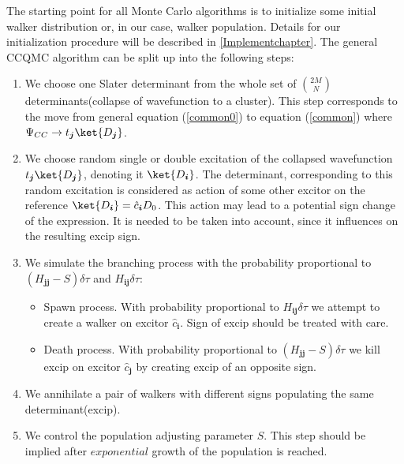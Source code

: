 \documentclass[twoside,english]{uiofysmaster}
\begin{document}
The starting point for all Monte Carlo algorithms is to initialize some initial walker distribution or, in our case, walker population. Details for our initialization procedure will be described in \autoref{Implementchapter}. The general CCQMC algorithm can be split up into the following steps:

\begin{enumerate}
	\item  We choose one Slater determinant from the whole set of $\binom {2M}{N}$ determinants(collapse of wavefunction to a cluster). This step corresponds to the move from general equation (\ref{common0}) to equation (\ref{common}) where $\Psi_{CC} \rightarrow t_{\boldsymbol{j}}\ket{D_{\boldsymbol{j}}}$.
	
	\item We choose random single or double excitation of the collapsed wavefunction $t_{\boldsymbol{j}}\ket{D_{\boldsymbol{j}}}$, denoting it $\ket{D_{\boldsymbol{i}}}$.
			The determinant, corresponding to this random excitation is considered as action of some other excitor on the reference $\ket{D_{\boldsymbol{i}}} = \hat{c}_{\boldsymbol{i}}D_0$. This action may lead to a potential sign change of the expression. It is needed to be taken into account, since it influences on the resulting excip sign.
%				
	\item We simulate the branching process with the probability proportional to $(H_{\boldsymbol{j}\boldsymbol{j}} - S)\delta \tau$ and $H_{\boldsymbol{i}\boldsymbol{j}}\delta \tau$:
	 \begin{itemize}
	 \item Spawn process. With probability proportional to $H_{\boldsymbol{i}\boldsymbol{j}}\delta \tau$ we attempt to create a walker on excitor $\hat{c}_{\boldsymbol{i}}$. Sign of excip should be treated with care. 
	 \item Death process. With probability proportional to $(H_{\boldsymbol{j}\boldsymbol{j}} - S)\delta \tau$ we kill excip on excitor $\hat{c}_{\boldsymbol{j}}$ by creating excip of an opposite sign.
	\end{itemize}
	
	\item We annihilate a pair of walkers with different signs populating the same determinant(excip).
	
	\item We control the population adjusting parameter $S$. This step should be implied after $exponential$ growth of the population is reached.
	

\end{enumerate}
\end{document}
